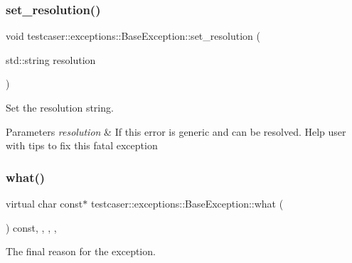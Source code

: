 \mbox{\label{classtestcaser_1_1exceptions_1_1BaseException_a92c371d40b0f3dbaa7de968ea67e5211}} 
\subsubsection{\texorpdfstring{set\_resolution()}{set\_resolution()}}
{\footnotesize\ttfamily void testcaser\+::exceptions\+::\+Base\+Exception\+::set\+\_\+resolution (\begin{DoxyParamCaption}\item[{std\+::string}]{resolution }\end{DoxyParamCaption})\hspace{0.3cm}{\ttfamily [inline]}}



Set the resolution string. 


\begin{DoxyParams}{Parameters}
{\em resolution} & If this error is generic and can be resolved. Help user with tips to fix this fatal exception \\
\hline
\end{DoxyParams}
\mbox{\label{classtestcaser_1_1exceptions_1_1BaseException_a28590a861913f870d9761990853e74b7}} 
\subsubsection{\texorpdfstring{what()}{what()}}
{\footnotesize\ttfamily virtual char const$\ast$ testcaser\+::exceptions\+::\+Base\+Exception\+::what (\begin{DoxyParamCaption}{ }\end{DoxyParamCaption}) const\hspace{0.3cm}{\ttfamily [inline]}, {\ttfamily [final]}, {\ttfamily [override]}, {\ttfamily [virtual]}, {\ttfamily [noexcept]}}



The final reason for the exception. 

